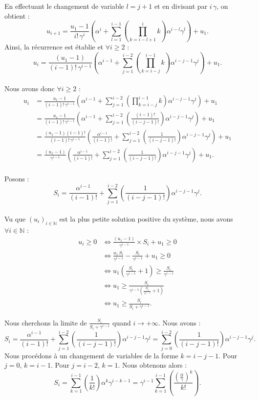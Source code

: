 \documentclass[12pt,a4paper]{report}
\theoremstyle{remark}
\begin{document}
En effectuant le changement de variable $l=j+1$ et en divisant par $i \, \gamma$, on obtient :
$$u_{i+1}=\frac{u_1 - 1}{i! \, \gamma^{i}}\left(\alpha^{i} + \sum_{l=1}^{i-1}(\prod_{k=i-l+1}^{i} k) \alpha^{i-l} \gamma^{l}\right)+  u_1.$$
Ainsi, la récurrence est établie et $\forall i \geqslant 2$ :
$$u_i = \frac{(u_1 - 1)}{(i-1)! \, \gamma^{i-1}} \left( \alpha^{i-1} + \sum_{j=1}^{i-2}\left(\prod_{k=i-j}^{i-1} k\right) \alpha^{i-j-1} \gamma^j \right) + u_1.$$
\\
Nous avons donc $\forall i \geqslant 2$ :
\begin{align*}
u_i &= \frac{u_1 - 1}{(i-1)! \, \gamma^{i-1}} \left( \alpha^{i-1} + \sum_{j=1}^{i-2}(\prod_{k=i-j}^{i-1} k) \alpha^{i-j-1} \gamma^j \right) + u_1 \\
&= \frac{u_1 - 1}{(i-1)! \, \gamma^{i-1}} \left( \alpha^{i-1} + \sum_{j=1}^{i-2}\left(\frac{(i-1)!}{(i-j-1)!}\right) \alpha^{i-j-1} \gamma^j \right) + u_1 \\
&= \frac{(u_1 - 1)(i-1)!}{(i-1)! \, \gamma^{i-1}} \left( \frac{\alpha^{i-1}}{(i-1)!} + \sum_{j=1}^{i-2}\left(\frac{1}{(i-j-1)!}\right) \alpha^{i-j-1} \gamma^j \right) + u_1 \\
&= \frac{(u_1 - 1)}{\gamma^{i-1}} \left( \frac{\alpha^{i-1}}{(i-1)!} + \sum_{j=1}^{i-2}\left(\frac{1}{(i-j-1)!}\right) \alpha^{i-j-1} \gamma^j \right) + u_1.
\end{align*}
\\
Posons : $$S_i = \frac{\alpha^{i-1}}{(i-1)!} + \sum_{j=1}^{i-2}\left(\frac{1}{(i-j-1)!}\right) \alpha^{i-j-1} \gamma^j.$$
\\
Vu que $(u_i)_{i \in \mathbb{N}}$ est la plus petite solution positive du système, nous avons $\forall i \in \mathbb{N}$ :
\begin{align*}
u_i \geqslant 0 &\iff \frac{(u_1 - 1)}{\gamma^{i-1}} \times S_i + u_1 \geqslant 0 \\
&\iff \frac{u_1 \, S_i}{\gamma^{i-1}} - \frac{S_i}{\gamma^{i-1}} + u_1 \geqslant 0 \\
&\iff u_1 \left(\frac{S_i}{\gamma^{i-1}} + 1 \right) \geqslant \frac{S_i}{\gamma^{i-1}} \\
&\iff u_1 \geqslant \frac{S_i}{\gamma^{i-1}\left(\frac{S_i}{\gamma^{i-1}} + 1 \right)} \\
&\iff u_1 \geqslant \frac{S_i}{S_i + \gamma^{i-1}}.
\end{align*}

Nous cherchons la limite de $\frac{S_i}{S_i + \gamma^{i-1}}$ quand $i \rightarrow +\infty$. Nous avons :
$$S_i = \frac{\alpha^{i-1}}{(i-1)!}
 + \sum_{j=1}^{i-2}\left(\frac{1}{(i-j-1)!}\right) \alpha^{i-j-1} \gamma^j = \sum_{j=0}^{i-2}\left(\frac{1}{(i-j-1)!}\right) \alpha^{i-j-1} \gamma^j.$$
Nous procédons à un changement de variables de la forme $k = i-j-1$. Pour $j=0$, $k=i-1$. Pour $j=i-2$, $k=1$. Nous obtenons alors :
$$S_i = \sum_{k=1}^{i-1}\left(\frac{1}{k!}\right) \alpha^{k} \gamma^{i-k-1} = \gamma^{i-1} \sum_{k=1}^{i-1}\left(\frac{\left(\frac{\alpha}{\gamma}\right)^k}{k!}\right).$$
\end{document}
